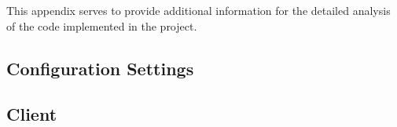 \documentclass[10pt,twocolumn]{witseiepaper}
\begin{document}
	This appendix serves to provide additional information for the detailed analysis of the code implemented in the project.
	
	\subsection{Configuration Settings}
	\label{app:config}
		
		
		
		
		
	\subsection{Client}
	\label{app:client}
	
		
		
		
		
		



\end{document}
